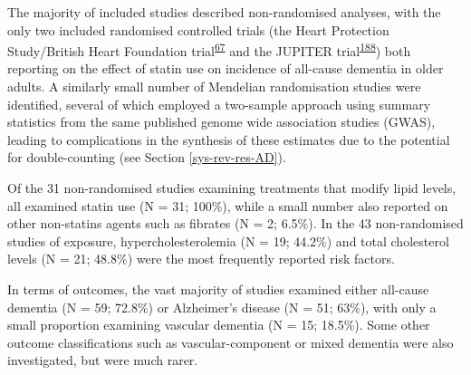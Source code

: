 \documentclass[a4paper, twoside]{templates/ociamthesis}
\begin{document}
The majority of included studies described non-randomised analyses, with the only two included randomised controlled trials (the Heart Protection Study/British Heart Foundation trial\textsuperscript{\protect\hyperlink{ref-heartprotectionstudycollaborativegroup2002}{67}} and the JUPITER trial\textsuperscript{\protect\hyperlink{ref-ridker2008}{188}}) both reporting on the effect of statin use on incidence of all-cause dementia in older adults. A similarly small number of Mendelian randomisation studies were identified, several of which employed a two-sample approach using summary statistics from the same published genome wide association studies (GWAS), leading to complications in the synthesis of these estimates due to the potential for double-counting (see Section \ref{sys-rev-res-AD}).

Of the 31 non-randomised studies examining treatments that modify lipid levels, all examined statin use (N = 31; 100\%), while a small number also reported on other non-statins agents such as fibrates (N = 2; 6.5\%). In the 43 non-randomised studies of exposure, hypercholesterolemia (N = 19; 44.2\%) and total cholesterol levels (N = 21; 48.8\%) were the most frequently reported risk factors.

In terms of outcomes, the vast majority of studies examined either all-cause dementia (N = 59; 72.8\%) or Alzheimer's disease (N = 51; 63\%), with only a small proportion examining vascular dementia (N = 15; 18.5\%). Some other outcome classifications such as vascular-component or mixed dementia were also investigated, but were much rarer.
\end{document}
